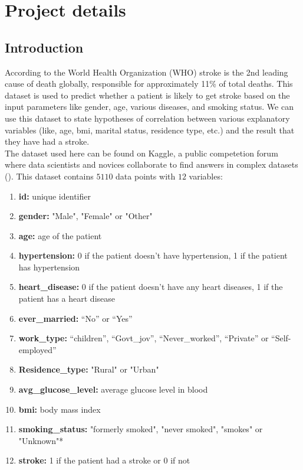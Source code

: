 \documentclass[boxes, qed]{homework}
\begin{document}
\section*{Project details}
\subsection*{Introduction}
According to the World Health Organization (WHO) stroke is the 2nd leading cause of death globally, 
responsible for approximately 11\% of total deaths. This dataset is used to predict whether a patient
is likely to get stroke based on the input parameters like gender, age, various diseases, and smoking 
status. We can use this dataset to state hypotheses of correlation between various explanatory
variables (like, age, bmi, marital status, residence type, etc.) and the result that they have had
a stroke.\\
The dataset used here can be found on Kaggle, a public competetion forum
where data scientists and novices collaborate to find answers in complex datasets
(\cite{kaggle}). This dataset contains $5110$ data points with $12$ variables:
\begin{enumerate}
  \item \textbf{id:} unique identifier
  \item \textbf{gender:} "Male", "Female" or "Other"
  \item \textbf{age:} age of the patient
  \item \textbf{hypertension:} 0 if the patient doesn't have hypertension, 1 if the patient has hypertension
  \item \textbf{heart\_disease:} 0 if the patient doesn't have any heart diseases, 1 if the patient has a heart disease
  \item \textbf{ever\_married:} ``No'' or ``Yes''
  \item \textbf{work\_type:} ``children'', ``Govt\_jov'', ``Never\_worked'', ``Private'' or ``Self-employed''
  \item \textbf{Residence\_type:} "Rural" or "Urban"
  \item \textbf{avg\_glucose\_level:} average glucose level in blood
  \item \textbf{bmi:} body mass index
  \item \textbf{smoking\_status:} "formerly smoked", "never smoked", "smokes" or "Unknown"*
  \item \textbf{stroke:} 1 if the patient had a stroke or 0 if not
\end{enumerate}
\end{document}
